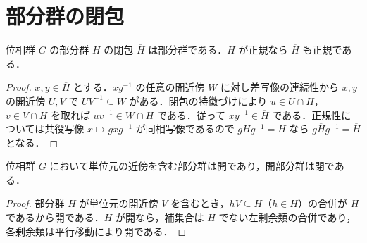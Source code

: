 \section{部分群の閉包}
\begin{prop}[部分群の閉包]
位相群 $G$ の部分群 $H$ の閉包 $\overline H$ は部分群である．$H$ が正規なら $\overline H$ も正規である．
\end{prop}
\begin{proof}
$x,y\in\overline H$ とする．$xy^{-1}$ の任意の開近傍 $W$ に対し差写像の連続性から $x,y$ の開近傍 $U,V$ で $UV^{-1}\subseteq W$ がある．閉包の特徴づけにより $u\in U\cap H$，$v\in V\cap H$ を取れば $uv^{-1}\in W\cap H$ である．従って $xy^{-1}\in\overline H$ である．正規性については共役写像 $x\mapsto gxg^{-1}$ が同相写像であるので $gHg^{-1}=H$ なら $g\overline H g^{-1}=\overline H$ となる．
\end{proof}
\begin{prop}[開部分群の閉性]
位相群 $G$ において単位元の近傍を含む部分群は開であり，開部分群は閉である．
\end{prop}
\begin{proof}
部分群 $H$ が単位元の開近傍 $V$ を含むとき，$hV\subseteq H$（$h\in H$）の合併が $H$ であるから開である．$H$ が開なら，補集合は $H$ でない左剰余類の合併であり，各剰余類は平行移動により開である．
\end{proof}
